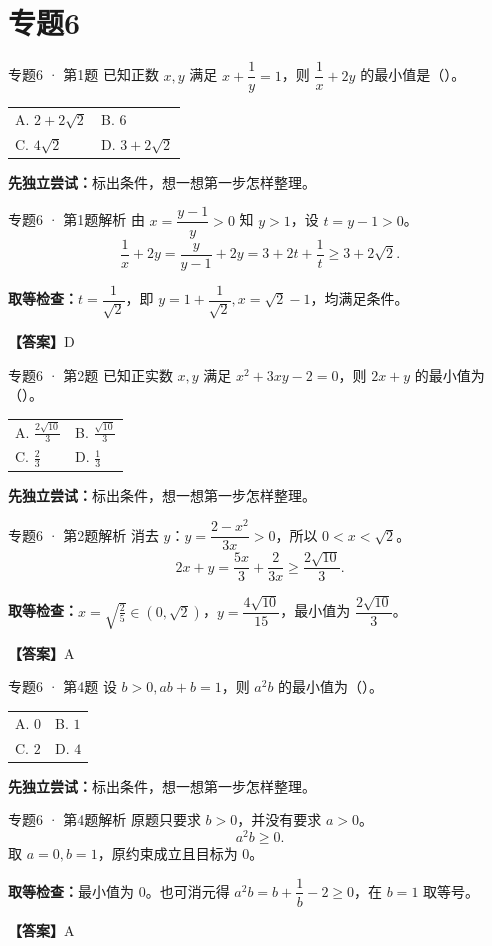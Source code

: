 \documentclass[UTF8,10pt,aspectratio=169]{ctexbeamer}
\makeatletter
\newcommand{\Answer}[1]{\par\vspace{0.2cm}\textbf{【答案】}#1}
\newcommand{\Choices}[4]{\par\vspace{0.2cm}\begin{tabular}{@{}p{0.47\textwidth}p{0.47\textwidth}@{}}A. #1 & B. #2 \\[0.15cm] C. #3 & D. #4\end{tabular}}
\makeatother
\begin{document}
\section{专题6}
\begin{frame}[t]{专题6 · 第1题}
已知正数 $x,y$ 满足 $x+\dfrac1y=1$，则 $\dfrac1x+2y$ 的最小值是（\quad）。
\Choices{$2+2\sqrt2$}{$6$}{$4\sqrt2$}{$3+2\sqrt2$}
\par\vspace{0.3cm}\textbf{先独立尝试：}标出条件，想一想第一步怎样整理。
\end{frame}
\begin{frame}[t]{专题6 · 第1题解析}
由 $x=\dfrac{y-1}{y}>0$ 知 $y>1$，设 $t=y-1>0$。\[\frac1x+2y=\frac y{y-1}+2y=3+2t+\frac1t\ge3+2\sqrt2.\]
\pause
\par\vspace{0.2cm}\textbf{取等检查：}$t=\dfrac{1}{\sqrt2}$，即 $y=1+\dfrac{1}{\sqrt2},x=\sqrt2-1$，均满足条件。
\Answer{D}
\end{frame}
\begin{frame}[t]{专题6 · 第2题}
已知正实数 $x,y$ 满足 $x^2+3xy-2=0$，则 $2x+y$ 的最小值为（\quad）。
\Choices{$\frac{2\sqrt{10}}3$}{$\frac{\sqrt{10}}3$}{$\frac23$}{$\frac13$}
\par\vspace{0.3cm}\textbf{先独立尝试：}标出条件，想一想第一步怎样整理。
\end{frame}
\begin{frame}[t]{专题6 · 第2题解析}
消去 $y$：$y=\dfrac{2-x^2}{3x}>0$，所以 $0<x<\sqrt2$。\[2x+y=\frac{5x}{3}+\frac2{3x}\ge\frac{2\sqrt{10}}3.\]
\pause
\par\vspace{0.2cm}\textbf{取等检查：}$x=\sqrt{\frac{2}{5}}\in(0,\sqrt2)$，$y=\dfrac{4\sqrt{10}}{15}$，最小值为 $\dfrac{2\sqrt{10}}{3}$。
\Answer{A}
\end{frame}
\begin{frame}[t]{专题6 · 第4题}
设 $b>0,ab+b=1$，则 $a^2b$ 的最小值为（\quad）。
\Choices{$0$}{$1$}{$2$}{$4$}
\par\vspace{0.3cm}\textbf{先独立尝试：}标出条件，想一想第一步怎样整理。
\end{frame}
\begin{frame}[t]{专题6 · 第4题解析}
原题只要求 $b>0$，并没有要求 $a>0$。\[a^2b\ge0.\]取 $a=0,b=1$，原约束成立且目标为 $0$。
\pause
\par\vspace{0.2cm}\textbf{取等检查：}最小值为 $0$。也可消元得 $a^2b=b+\dfrac{1}{b}-2\ge0$，在 $b=1$ 取等号。
\Answer{A}
\end{frame}
\end{document}
